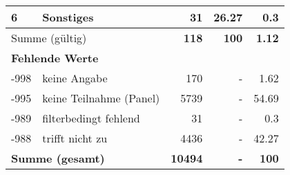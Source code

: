 \begin{longtable}{lXrrr}
     6 &
     \multicolumn{1}{X}{ Sonstiges   } &


       \num{31} &
       \num[round-mode=places,round-precision=2]{26.27} &
         \num[round-mode=places,round-precision=2]{0.3} \\
     \midrule
     \multicolumn{2}{l}{Summe (gültig)} &
       \textbf{\num{118}} &
     \textbf{\num{100}} &
       \textbf{\num[round-mode=places,round-precision=2]{1.12}} \\
     \multicolumn{5}{l}{\textbf{Fehlende Werte}}\\
       -998 &
       keine Angabe &
         \num{170} &
        - &
         \num[round-mode=places,round-precision=2]{1.62} \\
       -995 &
       keine Teilnahme (Panel) &
         \num{5739} &
        - &
         \num[round-mode=places,round-precision=2]{54.69} \\
       -989 &
       filterbedingt fehlend &
         \num{31} &
        - &
         \num[round-mode=places,round-precision=2]{0.3} \\
       -988 &
       trifft nicht zu &
         \num{4436} &
        - &
         \num[round-mode=places,round-precision=2]{42.27} \\
     \midrule
     \multicolumn{2}{l}{\textbf{Summe (gesamt)}} &
          \textbf{\num{10494}} &
        \textbf{-} &
        \textbf{\num{100}} \\
     \bottomrule
     \end{longtable}
     
